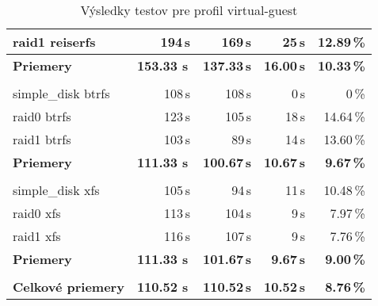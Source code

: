 \begin{table}[H]
\begin{center}
\begin{tabular}{|l|r r r r|}
    raid1 reiserfs & 194\,s & 169\,s & 25\,s & 12.89\,\% \\
    \hline
    \textbf{Priemery} & \textbf{153.33 s}\,& \textbf{137.33\,s} & \textbf{16.00\,s} & \textbf{10.33\,\%} \\
    \hline & \\[-1em]\hline
    simple\_disk btrfs & 108\,s & 108\,s & 0\,s & 0\,\% \\
    raid0 btrfs & 123\,s & 105\,s & 18\,s & 14.64\,\% \\
    raid1 btrfs & 103\,s & 89\,s & 14\,s & 13.60\,\% \\
    \hline
    \textbf{Priemery} & \textbf{111.33 s}\,& \textbf{100.67\,s} & \textbf{10.67\,s} & \textbf{9.67\,\%} \\
    \hline & \\[-1em]\hline
    simple\_disk xfs & 105\,s & 94\,s & 11\,s & 10.48\,\% \\
    raid0 xfs & 113\,s & 104\,s & 9\,s & 7.97\,\% \\
    raid1 xfs & 116\,s & 107\,s & 9\,s & 7.76\,\% \\
    \hline
    \textbf{Priemery} & \textbf{111.33 s}\,& \textbf{101.67\,s} & \textbf{9.67\,s} & \textbf{9.00\,\%} \\
    \hline & \\[-1em]\hline
    \textbf{Celkové priemery} & \textbf{110.52 s}\,& \textbf{110.52\,s} & \textbf{10.52\,s} & \textbf{8.76\,\%} \\
    \hline
\end{tabular}
\caption{Výsledky testov pre profil virtual-guest}
\label{tab:results-xfs}
\end{center}
\end{table}

%
%

